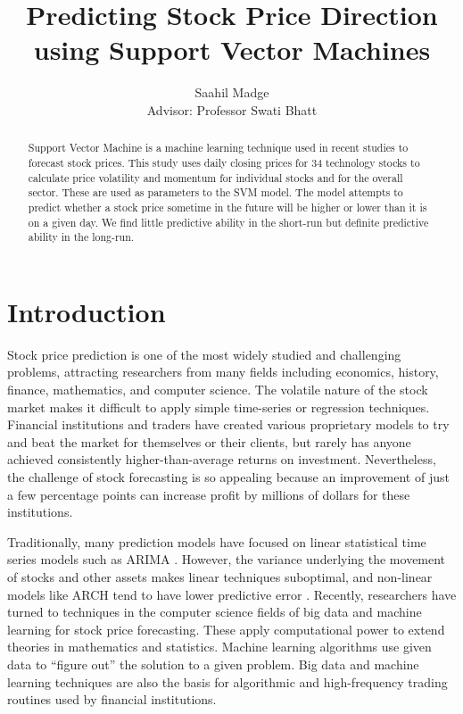 \documentclass[pageno]{jpaper}
\begin{document}
\title{
Predicting Stock Price Direction using Support Vector Machines}
\author{Saahil Madge \\ Advisor: Professor Swati Bhatt}

\date{}
\maketitle

\thispagestyle{empty}

\begin{abstract}
\bigskip
Support Vector Machine is a machine learning technique used in recent studies to forecast stock prices. This study uses daily closing prices for 34 technology stocks to calculate price volatility and momentum for individual stocks and for the overall sector. These are used as parameters to the SVM model. The model attempts to predict whether a stock price sometime in the future will be higher or lower than it is on a given day. We find little predictive ability in the short-run but definite predictive ability in the long-run.
\end{abstract}

\section{Introduction}

Stock price prediction is one of the most widely studied and challenging problems, attracting researchers from many fields including economics, history, finance, mathematics, and computer science. The volatile nature of the stock market makes it difficult to apply simple time-series or regression techniques. Financial institutions and traders have created various proprietary models to try and beat the market for themselves or their clients, but rarely has anyone achieved consistently higher-than-average returns on investment. Nevertheless, the challenge of stock forecasting is so appealing because an improvement of just a few percentage points can increase profit by millions of dollars for these institutions.

Traditionally, many prediction models have focused on linear statistical time series models such as ARIMA \cite{bontempi}. However, the variance underlying the movement of stocks and other assets makes linear techniques suboptimal, and non-linear models like ARCH tend to have lower predictive error \cite{zhang}. Recently, researchers have turned to techniques in the computer science fields of big data and machine learning for stock price forecasting. These apply computational power to extend theories in mathematics and statistics. Machine learning algorithms use given data to ``figure out'' the solution to a given problem. Big data and machine learning techniques are also the basis for algorithmic and high-frequency trading routines used by financial institutions.
\end{document}
